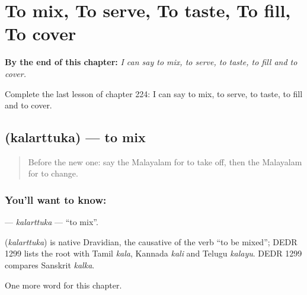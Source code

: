 
\chapter{To mix, To serve, To taste, To fill, To cover}
\label{ch:ml-to-mix-to-serve-to-taste-to-fill-to-cover}

\begin{chapteropening}
\textbf{By the end of this chapter:} \emph{I can say to mix, to serve, to taste, to fill and to cover.}

Complete the last lesson of chapter 224: I can say to mix, to serve, to taste, to fill and to cover.
\end{chapteropening}

\section[\texorpdfstring{\ml{കലർത്തുക} (kalarttuka)}{കലർത്തുക (kalarttuka)}]{ (kalarttuka) — to mix}

\label{lesson:ML-C224-kalarttuka}



\begin{quote}
Before the new one: say the Malayalam for to take off, then the Malayalam for to change.
\end{quote}

\subsection*{You'll want to know: }
\textbf{} — \emph{kalarttuka} — \textquotedblleft{}to mix\textquotedblright{}.

\begin{cousinweb}
\textbf{} (\emph{kalarttuka}) is native Dravidian, the causative of the verb \textquotedblleft{}to be mixed\textquotedblright{}; DEDR 1299 lists the root with Tamil \emph{kala}, Kannada \emph{kali} and Telugu \emph{kalayu}. DEDR 1299 compares Sanskrit \emph{kalka}.
\end{cousinweb}

\begin{grammarlens}[title={What you've built}]
One more word for this chapter.
\end{grammarlens}

